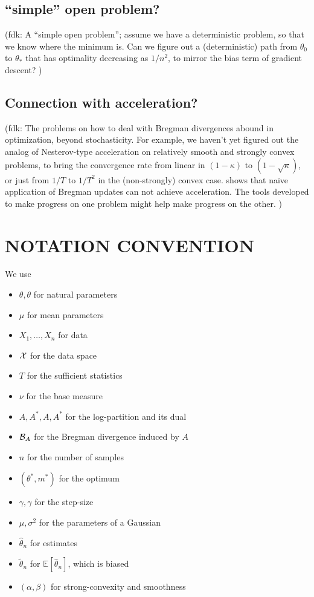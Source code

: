 \documentclass[twoside]{article}
\let\oldsection\section
\renewcommand{\section}[1]{\oldsection{\texorpdfstring{\uppercase{#1}}{#1}}}
\newcommand{\fdk}[1]{\textcolor{Periwinkle}{(fdk:#1)}}
\newcommand*{\expect}[2][]{\ensuremath{\mathbb{E}_{#1} \left[ #2 \right] }} %
\newcommand{\logpart}{A}
\newcommand{\conj}{\logpart^*}
\newcommand{\nat}{\theta}
\newcommand{\m}{\mu}
\newcommand{\lr}{\gamma} %
\newcommand{\stgcvx}{\alpha} %
\newcommand{\smooth}{\beta} %
\begin{document}
\subsection{``simple'' open problem?}
\fdk{
A ``simple open problem'';
assume we have a deterministic problem, so that we know where the minimum is.
Can we figure out a (deterministic) path from $\theta_0$ to $\theta_*$
that has optimality decreasing as $1/n^2$,
to mirror the bias term of gradient descent?
}

\subsection{Connection with acceleration?}
\fdk{
The problems on how to deal with Bregman divergences abound in optimization, beyond stochasticity.
For example, we haven't yet figured out the analog of Nesterov-type acceleration
on relatively smooth and strongly convex problems,
to bring the convergence rate from linear in $(1-\kappa)$ to $(1-\sqrt{\kappa})$,
or just from $1/T$ to $1/T^2$ in the (non-strongly) convex case.
\citet{dragomir2021optimal}  shows that naïve application of Bregman updates can not achieve acceleration.
The tools developed to make progress on one problem might help make progress on the other.
}






\newpage
\section{Notation convention}
We use
\begin{itemize}
	\item $\theta, \nat$ for natural parameters
	\item $\m$ for mean parameters
	\item $X_1,\ldots,X_n$ for data
	\item ${\mathcal X}$ for the data space
	\item $T$ for the sufficient statistics
	\item $\nu$ for the base measure
	\item $A, A^*, \logpart, \conj$ for the log-partition and its dual
	\item ${\mathcal B}_A$ for the Bregman divergence induced by $A$
	\item $n$ for the number of samples
	\item $(\theta^*,m^*)$ for the optimum
	\item $\gamma, \lr$ for the step-size
	\item $\mu,\sigma^2$ for the parameters of a Gaussian
	\item $\hat\theta_n$ for estimates
	\item $\tilde\theta_n$ for $\expect{\hat\theta_n}$, which is biased
	\item $(\stgcvx , \smooth)$ for strong-convexity and smoothness
\end{itemize}
\end{document}
